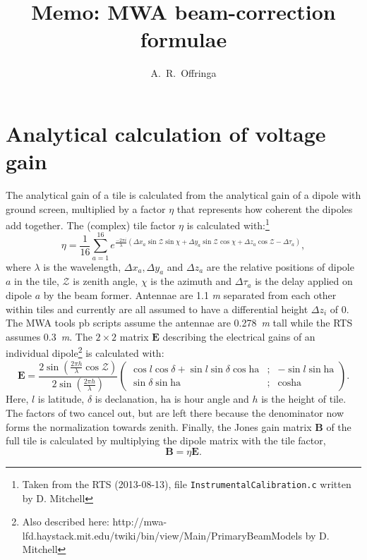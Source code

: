 \documentclass[a4paper,11pt]{article}
\title{Memo: MWA beam-correction formulae}
\author{A.~R.~Offringa}
\begin{document}
\label{firstpage}
\maketitle

\section{Analytical calculation of voltage gain}
The analytical gain of a tile is calculated from the analytical gain of a dipole with ground screen, multiplied by a factor $\eta$ that represents how coherent the dipoles add together. The (complex) tile factor $\eta$ is calculated with:\footnote{Taken from the RTS (2013-08-13), file \texttt{InstrumentalCalibration.c} written by D. Mitchell}
\begin{equation}
 \eta = \frac{1}{16}\sum\limits_{a=1}^{16} e^{\frac{-2 \pi i}{\lambda} \left(\Delta x_a \sin \mathcal{Z} \sin \chi + \Delta y_a \sin \mathcal{Z} \cos \chi + \Delta z_a \cos \mathcal{Z} - \Delta \tau_a \right) },
\end{equation}
where $\lambda$ is the wavelength, $\Delta x_a, \Delta y_a$ and $\Delta z_a$ are the relative positions of dipole $a$ in the tile, $\mathcal{Z}$ is zenith angle, $\chi$ is the azimuth and $\Delta \tau_a$ is the delay applied on dipole $a$ by the beam former. Antennae are 1.1 \textit{m} separated from each other within tiles and currently are all assumed to have a differential height $\Delta z_i$ of 0. The MWA tools pb scripts assume the antennae are 0.278~\textit{m} tall while the RTS assumes 0.3~\textit{m}. The $2 \times 2$ matrix $\textbf{E}$ describing the electrical gains of an individual dipole\footnote{Also described here: http://mwa-lfd.haystack.mit.edu/twiki/bin/view/Main/PrimaryBeamModels by D. Mitchell} is calculated with:
\begin{equation}
\mathbf{E} = \frac{2 \sin \left( \frac{2 \pi h}{\lambda} \cos \mathcal{Z}\right)}{2 \sin \left( \frac{2 \pi h}{\lambda}\right)}
\left( \begin{array}{ccc}
\cos l \cos \delta + \sin l \sin \delta \cos \textrm{ha} & ; & -\sin l \sin \textrm{ha} \\
\sin \delta \sin \textrm{ha} & ; & \cos \textrm{ha}
\end{array} \right).
\end{equation}
Here, $l$ is latitude, $\delta$ is declanation, $\textrm{ha}$ is hour angle and $h$ is the height of tile. The factors of two cancel out, but are left there because the denominator now forms the normalization towards zenith. Finally, the Jones gain matrix $\textbf{B}$ of the full tile is calculated by multiplying the dipole matrix with the tile factor,
\begin{equation}
\mathbf{B} = \eta \mathbf{E}.
\end{equation}
\end{document}
